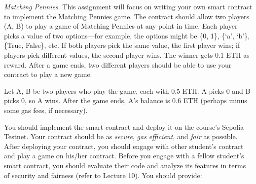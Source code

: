 \documentclass[12pt,addpoints,answers]{exam}
\begin{document}
\begin{questions}

\newpage

 {\em Matching Pennies}. This assignment will focus on writing your own smart contract to implement the \href{https://en.wikipedia.org/wiki/Matching_pennies}{Matching Pennies} game. The contract should allow two players (A, B) to play a game of Matching Pennies at any point in time. Each player picks a value of two options---for example, the options might be \{0, 1\}, \{`a’, ‘b’\}, \{True, False\}, etc. If both players pick the same value, the first player wins; if players pick different values, the second player wins. The winner gets 0.1 ETH as reward. After a game ends, two different players should be able to use your contract to play a new game.

 Let A, B be two players who play the game, each with 0.5 ETH.  A picks 0 and B picks 0, so A wins. After the game ends, A’s balance is 0.6 ETH (perhaps minus some gas fees, if necessary).

You should implement the smart contract and deploy it on the course's Sepolia Testnet.  Your contract should be as {\em secure}, {\em gas efficient}, and {\em fair} as possible. After deploying your contract, you should engage with other student's contract and play a game on his/her contract. Before you engage with a fellow student’s smart contract, you should evaluate their code and analyze its features in terms of security and fairness (refer to Lecture 10). You should provide:

\end{questions}
\end{document}
